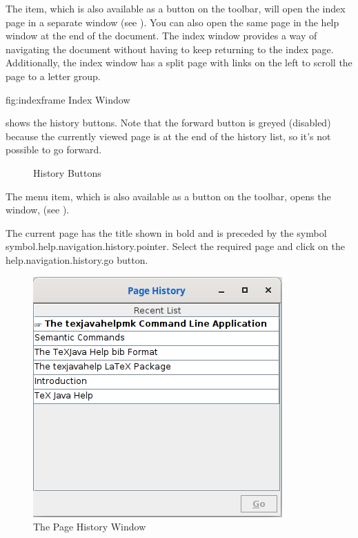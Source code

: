 
The  item, which is also available
as a button on the toolbar, will open the index page in a separate
window (see ). You can also open the same
page in the help window at the end of the document. The index window
provides a way of navigating the document without having to keep
returning to the index page. Additionally, the index window has a
split page with links on the left to scroll the page to a letter
group.

\FloatFig
{fig:indexframe}
{%
}
{Index Window}

 shows the history buttons.
Note that the forward button is greyed (disabled) because the
currently viewed page is at the end of the history list, so it's not
possible to go forward.

\begin{figure}
\centering
{}

\caption{History Buttons}
\label{fig:historybuttons}
\end{figure}


The  menu item, which is also
available as a button on the toolbar, opens the
 window,
(see ).

The current page has the title shown in bold and is preceded by
the symbol \gls{symbol.help.navigation.history.pointer}.
Select the required page and click on the
\gls{help.navigation.history.go} button.

\begin{figure}
\centering
\includegraphics{images/historyframe}

\caption{The Page History Window}
\label{fig:historywindow}
\end{figure}

